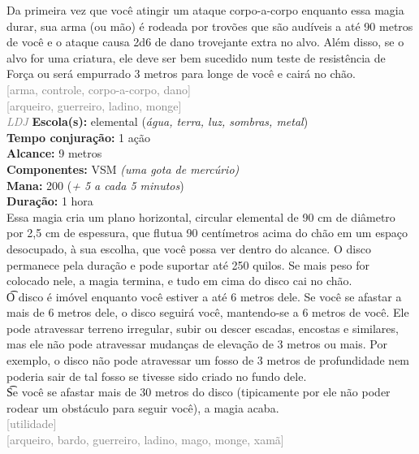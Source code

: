 \documentclass{RPG_Adventure}[2021/10/20]
\begin{document}
{\normalsize Da primeira vez que você atingir um ataque corpo-a-corpo enquanto essa magia durar, sua arma (ou mão) é rodeada por trovões que são audíveis a até 90 metros de você e o ataque causa 2d6 de dano trovejante extra no alvo. Além disso, se o alvo for uma criatura, ele deve ser bem sucedido num teste de resistência de Força ou será empurrado 3 metros para longe de você e cairá no chão.\\}
{\scriptsize \textcolor{gray}{[arma, controle, corpo-a-corpo, dano]\\}}
{\scriptsize \textcolor{gray}{[arqueiro, guerreiro, ladino, monge]\\}}
{\tiny \textcolor{gray}{\textit{LDJ}}}\jump{}
{\small \t \textbf{Escola(s):} elemental (\textit{água, terra, luz, sombras, metal})\\\t \textbf{Tempo conjuração:} 1 ação\\\t \textbf{Alcance:} 9 metros\\\t \textbf{Componentes:} VSM \textit{(uma gota de mercúrio)}\\\t \textbf{Mana:} 200 (\textit{+ 5 a cada 5 minutos})\\\t \textbf{Duração:} 1 hora\\}
{\normalsize Essa magia cria um plano horizontal, circular elemental de 90 cm de diâmetro por 2,5 cm de espessura, que flutua 90 centímetros acima do chão em um espaço desocupado, à sua escolha, que você possa ver dentro do alcance. O disco permanece pela duração e pode suportar até 250 quilos. Se mais peso for colocado nele, a magia termina, e tudo em cima do disco cai no chão.\\\t O disco é imóvel enquanto você estiver a até 6 metros dele. Se você se afastar a mais de 6 metros dele, o disco seguirá você, mantendo-se a 6 metros de você. Ele pode atravessar terreno irregular, subir ou descer escadas, encostas e similares, mas ele não pode atravessar mudanças de elevação de 3 metros ou mais. Por exemplo, o disco não pode atravessar um fosso de 3 metros de profundidade nem poderia sair de tal fosso se tivesse sido criado no fundo dele.\\\t Se você se afastar mais de 30 metros do disco (tipicamente por ele não poder rodear um obstáculo para seguir você), a magia acaba.\\}
{\scriptsize \textcolor{gray}{[utilidade]\\}}
{\scriptsize \textcolor{gray}{[arqueiro, bardo, guerreiro, ladino, mago, monge, xamã]\\}}
\end{document}
